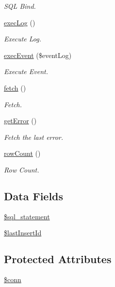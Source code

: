 \begin{DoxyCompactItemize}
\begin{DoxyCompactList}\small\item\em \-S\-Q\-L \-Bind. \end{DoxyCompactList}\item 
\hyperlink{classdb_helper_a75dea4073687142b0b1b6a6819cbb243}{exec\-Log} ()
\begin{DoxyCompactList}\small\item\em \-Execute \-Log. \end{DoxyCompactList}\item 
\hyperlink{classdb_helper_ac1876160b600b359a60fd5aad7edba09}{exec\-Event} (\$event\-Log)
\begin{DoxyCompactList}\small\item\em \-Execute \-Event. \end{DoxyCompactList}\item 
\hyperlink{classdb_helper_ae48cc10bd727774bb36203986ce3b176}{fetch} ()
\begin{DoxyCompactList}\small\item\em \-Fetch. \end{DoxyCompactList}\item 
\hyperlink{classdb_helper_a24ada5decce3d1b79cd82f5a90ccf404}{get\-Error} ()
\begin{DoxyCompactList}\small\item\em \-Fetch the last error. \end{DoxyCompactList}\item 
\hyperlink{classdb_helper_a82b073888555fc72e57142fe913db377}{row\-Count} ()
\begin{DoxyCompactList}\small\item\em \-Row \-Count. \end{DoxyCompactList}\end{DoxyCompactItemize}
\subsection*{\-Data \-Fields}
\begin{DoxyCompactItemize}
\item 
\hyperlink{classdb_helper_a29c1e591b4e284bca5ae38ed00eea5a9}{\$sql\-\_\-statement}
\item 
\hyperlink{classdb_helper_ae4ac788f919cb92f528ab1455e8a3e6b}{\$last\-Insert\-Id}
\end{DoxyCompactItemize}
\subsection*{\-Protected \-Attributes}
\begin{DoxyCompactItemize}
\item 
\hyperlink{classdb_helper_aa8a5a87b9c1a6a0819b88447cbe41877}{\$conn}
\end{DoxyCompactItemize}



